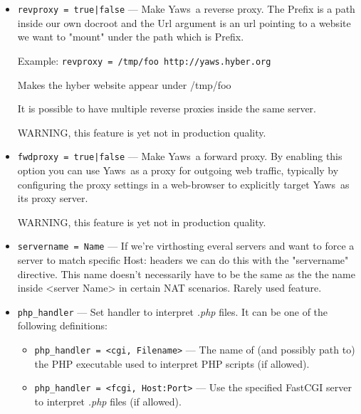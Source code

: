 \documentclass[11pt,oneside,english]{book}
\newcommand{\Yaws}            %
        {{\sc Yaws}}
\begin{document}
\begin{itemize}
\item       \verb+revproxy = true|false+ ---
              Make \Yaws\ a reverse proxy. The Prefix is a path inside our own
              docroot and the Url argument is an url pointing to a website we
              want to "mount" under the path which is Prefix.

              Example: \verb+revproxy = /tmp/foo http://yaws.hyber.org+

              Makes the hyber website appear under /tmp/foo

              It is possible to have multiple reverse proxies inside the same
              server.

              WARNING, this feature is yet not in production quality.

\item       \verb+fwdproxy = true|false+ ---
              Make \Yaws\ a forward proxy. By enabling this option you can use
              \Yaws\ as a proxy for outgoing web traffic, typically by
              configuring the proxy settings in a web-browser to explicitly
              target \Yaws\ as its proxy server.

              WARNING, this feature is yet not in production quality.

\item       \verb+servername = Name+ ---
              If we're virthosting everal servers and want to force a server to
              match specific Host: headers we can do this with the "servername"
              directive. This name doesn't necessarily have to be the same as
              the the name inside <server Name> in certain NAT scenarios. Rarely
              used feature.

\item       \verb+php_handler+ ---
              Set handler to interpret \textit{.php} files. It can be
              one of the following definitions:

              \begin{itemize}
              \item \verb+php_handler = <cgi, Filename>+ --- The name
                of (and possibly path to) the PHP executable used to
                interpret PHP scripts (if allowed).
              \item \verb+php_handler = <fcgi, Host:Port>+ --- Use the
                specified FastCGI server to interpret \textit{.php}
                files (if allowed).


\end{itemize}
\end{itemize}
\end{document}
